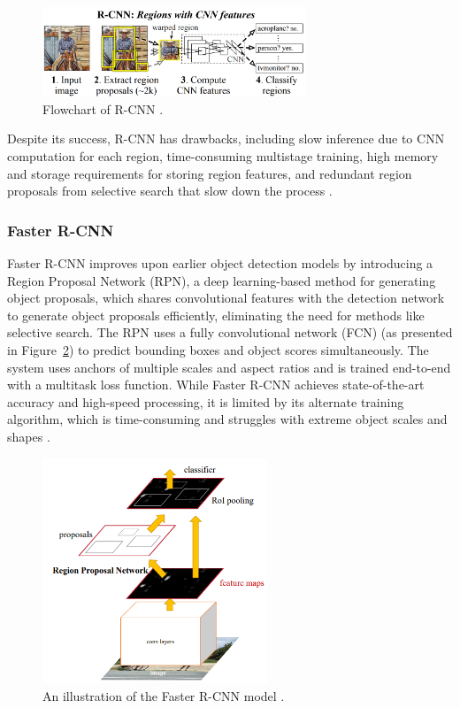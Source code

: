 \begin{figure}[H] %
    \centering
    \includegraphics[width=0.7\textwidth]{chapters/chapter1/images/Figure17.png}
    \caption{Flowchart of R-CNN \parencite{zhao2019objectdetection}.}
    \label{fig:figure17}
\end{figure}

Despite its success, R-CNN has drawbacks, including slow inference due to CNN computation for each region, time-consuming multistage training, high memory and storage requirements for storing region features, and redundant region proposals from selective search that slow down the process \parencite{zhao2019objectdetection}.


\subsubsection{Faster R-CNN}


Faster R-CNN improves upon earlier object detection models by introducing a Region Proposal Network (RPN), a deep learning-based method for generating object proposals, which shares convolutional features with the detection network to generate object proposals efficiently, eliminating the need for methods like selective search. The RPN uses a fully convolutional network (FCN) (as presented in Figure~\ref{fig:figure18}) to predict bounding boxes and object scores simultaneously. The system uses anchors of multiple scales and aspect ratios and is trained end-to-end with a multitask loss function. While Faster R-CNN achieves state-of-the-art accuracy and high-speed processing, it is limited by its alternate training algorithm, which is time-consuming and struggles with extreme object scales and shapes \parencite{zhao2019objectdetection}.

\begin{figure}[H] %
    \centering
    \includegraphics[width=0.6\textwidth]{chapters/chapter1/images/Figure18.png}
    \caption{An illustration of the Faster R-CNN model \parencite{ren2016faster}.}
    \label{fig:figure18}
\end{figure}

